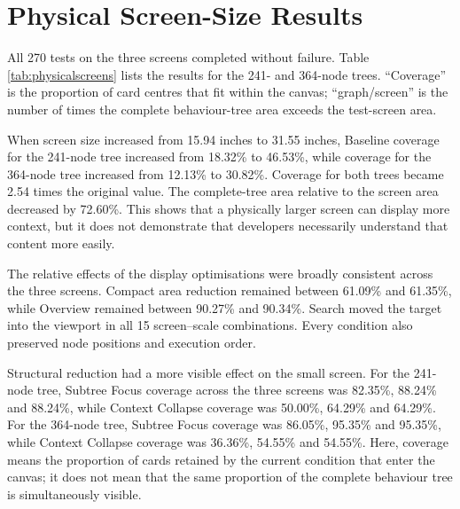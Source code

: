 \section{Physical Screen-Size Results}

All 270 tests on the three screens completed without failure. Table \ref{tab:physicalscreens} lists the results for the 241- and 364-node trees. ``Coverage'' is the proportion of card centres that fit within the canvas; ``graph/screen'' is the number of times the complete behaviour-tree area exceeds the test-screen area.

\begin{table}[htbp]
\centering
\caption{Complex-tree coverage on three physical screen sizes.}
\label{tab:physicalscreens}
\small
{}
\end{table}

When screen size increased from 15.94 inches to 31.55 inches, Baseline coverage for the 241-node tree increased from 18.32\% to 46.53\%, while coverage for the 364-node tree increased from 12.13\% to 30.82\%. Coverage for both trees became 2.54 times the original value. The complete-tree area relative to the screen area decreased by 72.60\%. This shows that a physically larger screen can display more context, but it does not demonstrate that developers necessarily understand that content more easily.

The relative effects of the display optimisations were broadly consistent across the three screens. Compact area reduction remained between 61.09\% and 61.35\%, while Overview remained between 90.27\% and 90.34\%. Search moved the target into the viewport in all 15 screen--scale combinations. Every condition also preserved node positions and execution order.

Structural reduction had a more visible effect on the small screen. For the 241-node tree, Subtree Focus coverage across the three screens was 82.35\%, 88.24\% and 88.24\%, while Context Collapse coverage was 50.00\%, 64.29\% and 64.29\%. For the 364-node tree, Subtree Focus coverage was 86.05\%, 95.35\% and 95.35\%, while Context Collapse coverage was 36.36\%, 54.55\% and 54.55\%. Here, coverage means the proportion of cards retained by the current condition that enter the canvas; it does not mean that the same proportion of the complete behaviour tree is simultaneously visible.
